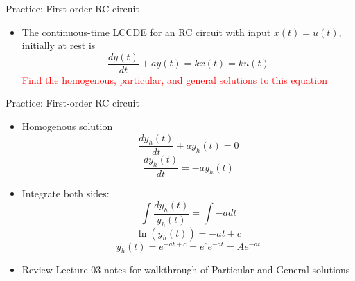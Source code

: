 \begin{frame}{Practice: First-order RC circuit}
    \begin{itemize}
        \item The continuous-time LCCDE for an RC circuit with input $x(t) = u(t)$, initially at rest is
            \[
                \frac{dy(t)}{dt} + ay(t) = k x(t) = k u(t)
            \]
            \textcolor{red}{Find the homogenous, particular, and general solutions to this equation}

    \end{itemize}

\end{frame}

\begin{frame}{Practice: First-order RC circuit}
    \begin{itemize}
        \item Homogenous solution
            \[
                \frac{dy_h(t)}{dt} + ay_h(t) = 0
            \]
            \[ \frac{dy_h(t)}{dt} = -a y_h(t)
            \]
        \item Integrate both sides:
        \[ \int \frac{dy_h(t)}{y_h(t)} = \int -a dt \]
            \[ \ln (y_h(t)) = -at + c
            \]
            \[y_h(t) = e^{-at + c} = e^c e^{-at} = A e^{-at}
            \]
      \item Review Lecture 03 notes for walkthrough of Particular and General solutions
    \end{itemize}

\end{frame}
